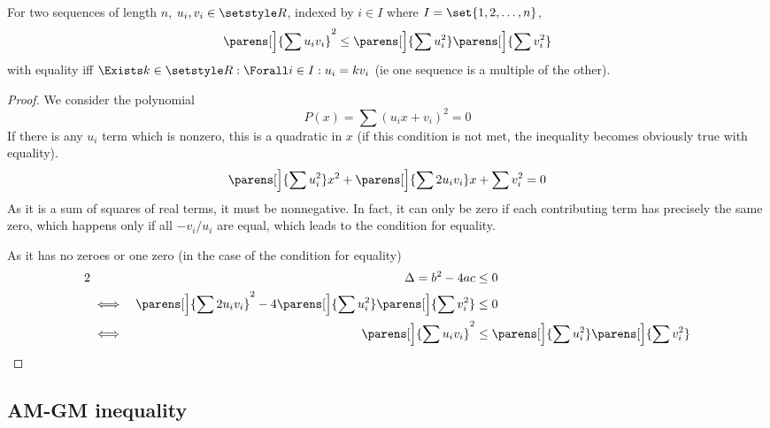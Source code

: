 \begin{theorem}
For two sequences of length \(n\), \(u_i, v_i \in \Reals\), indexed by
\(i \in I\) where \(I = \set{1, 2, \dotsc, n}\),
\begin{equation*}
    \parens[\Big]{\sum u_i v_i}^2 \le
        \parens[\Big]{\sum u_i^2} \parens[\Big]{\sum v_i^2}
\end{equation*}
with equality iff \(\Exists k \in \Reals: \Forall i \in I: u_i = k v_i\) (ie one
sequence is a multiple of the other).
\end{theorem}
\begin{proof}
We consider the polynomial
\begin{equation*}
P(x) = \sum (u_i x + v_i)^2 = 0
\end{equation*}
If there is any \(u_i\) term which is nonzero, this is a quadratic in \(x\)
(if this condition is not met, the inequality becomes obviously true with
equality).
\begin{equation*}
    \parens[\Big]{\sum u_i^2} x^2
  + \parens[\Big]{\sum 2 u_i v_i} x + \sum v_i^2 = 0
\end{equation*}
As it is a sum of squares of real terms, it must be nonnegative. In fact, it
can only be zero if each contributing term has precisely the same zero,
which happens only if all \(-v_i/u_i\) are equal, which leads to the
condition for equality.

As it has no zeroes or one zero (in the case of the condition for equality)
\begin{alignat*}2
&&\Delta = b^2 - 4ac &\le 0 \\
&\iff&
\parens[\Big]{\sum 2 u_i v_i}^2 - 4\parens[\Big]{\sum u_i^2}\parens[\Big]{\sum v_i^2} &\le 0 \\
&\iff& \parens[\Big]{\sum u_i v_i}^2 &\le \parens[\Big]{\sum u_i^2} \parens[\Big]{\sum v_i^2}
    \qedhere
\end{alignat*}
\end{proof}

\subsection{AM-GM inequality}

